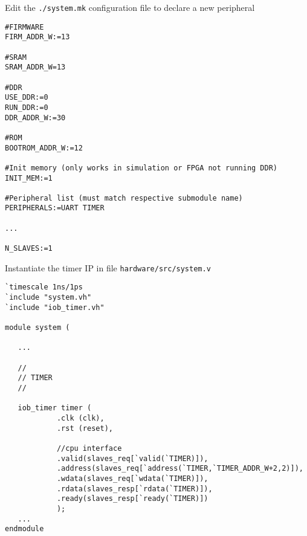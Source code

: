 \documentclass [xcolor=svgnames, t] {beamer}
\begin{document}
\begin{frame}[fragile]{Edit the {\tt ./system.mk} configuration file to declare a new peripheral}
\begin{tiny}
\begin{lstlisting}
#FIRMWARE
FIRM_ADDR_W:=13

#SRAM
SRAM_ADDR_W=13

#DDR
USE_DDR:=0
RUN_DDR:=0
DDR_ADDR_W:=30

#ROM
BOOTROM_ADDR_W:=12

#Init memory (only works in simulation or FPGA not running DDR)
INIT_MEM:=1

#Peripheral list (must match respective submodule name)
PERIPHERALS:=UART TIMER

...

N_SLAVES:=1
\end{lstlisting}
\end{tiny}
\end{frame}


\begin{frame}[fragile]{Instantiate the timer IP in file {\tt hardware/src/system.v}}
\begin{tiny}
\begin{lstlisting}
`timescale 1ns/1ps
`include "system.vh"
`include "iob_timer.vh"

module system (

   ...

   //
   // TIMER
   //

   iob_timer timer (
		    .clk (clk),
		    .rst (reset),

		    //cpu interface
		    .valid(slaves_req[`valid(`TIMER)]),
		    .address(slaves_req[`address(`TIMER,`TIMER_ADDR_W+2,2)]),
		    .wdata(slaves_req[`wdata(`TIMER)]),
		    .rdata(slaves_resp[`rdata(`TIMER)]),
		    .ready(slaves_resp[`ready(`TIMER)])
		    );
   ...
endmodule
\end{lstlisting}
\end{tiny}
\end{frame}

\end{document}

